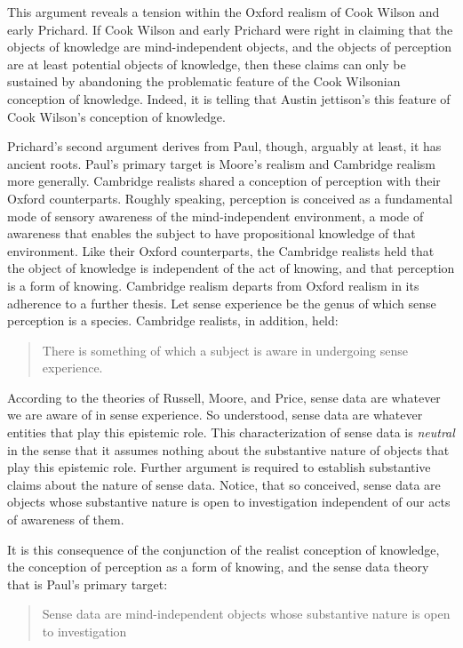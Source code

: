 This argument reveals a tension within the Oxford realism of Cook Wilson and early Prichard. If Cook Wilson and early Prichard were right in claiming that the objects of knowledge are mind-independent objects, and the objects of perception are at least potential objects of knowledge, then these claims can only be sustained by abandoning the problematic feature of the Cook Wilsonian conception of knowledge. Indeed, it is telling that Austin jettison's this feature of Cook Wilson's conception of knowledge.

Prichard's second argument derives from Paul, though, arguably at least, it has ancient roots. Paul's primary target is Moore's realism and Cambridge realism more generally. Cambridge realists shared a conception of perception with their Oxford counterparts. Roughly speaking, perception is conceived as a fundamental mode of sensory awareness of the mind-independent environment, a mode of awareness that enables the subject to have propositional knowledge of that environment. Like their Oxford counterparts, the Cambridge realists held that the object of knowledge is independent of the act of knowing, and that perception is a form of knowing. Cambridge realism departs from Oxford realism in its adherence to a further thesis. Let sense experience be the genus of which sense perception is a species. Cambridge realists, in addition, held:
\begin{quote}
	There is something of which a subject is aware in undergoing sense experience.
\end{quote}
According to the theories of Russell, Moore, and Price, sense data are whatever we are aware of in sense experience. So understood, sense data are whatever entities that play this epistemic role. This characterization of sense data is \emph{neutral} in the sense that it assumes nothing about the substantive nature of objects that play this epistemic role. Further argument is required to establish substantive claims about the nature of sense data. Notice, that so conceived, sense data are objects whose substantive nature is open to investigation independent of our acts of awareness of them. 

It is this consequence of the conjunction of the realist conception of knowledge, the conception of perception as a form of knowing, and the sense data theory that is Paul's primary target:
\begin{quote}
	Sense data are mind-independent objects whose substantive nature is open to investigation
\end{quote}

